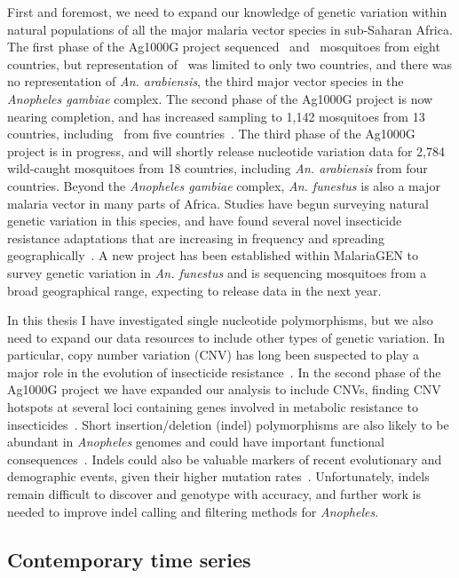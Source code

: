 \documentclass[a4paper,11pt,abstracton,hidelinks]{scrartcl}
\begin{document}
First and foremost, we need to expand our knowledge of genetic variation within natural populations of all the major malaria vector species in sub-Saharan Africa.
%
The first phase of the Ag1000G project sequenced \agam\ and \acol\ mosquitoes from eight countries, but representation of \acol\ was limited to only two countries, and there was no representation of \textit{An. arabiensis}, the third major vector species in the \textit{Anopheles gambiae} complex.
%
The second phase of the Ag1000G project is now nearing completion, and has increased sampling to 1,142 mosquitoes from 13 countries, including \acol\ from five countries~\parencite{Ag1000G2020}.
%
The third phase of the Ag1000G project is in progress, and will shortly release nucleotide variation data for 2,784 wild-caught mosquitoes from 18 countries, including \textit{An. arabiensis} from four countries.
%
Beyond the \textit{Anopheles gambiae} complex, \textit{An. funestus} is also a major malaria vector in many parts of Africa.
%
Studies have begun surveying natural genetic variation in this species, and have found several novel insecticide resistance adaptations that are increasing in frequency and spreading geographically~\parencite{Weedall2020}.
%
A new project has been established within MalariaGEN to survey genetic variation in \textit{An. funestus} and is sequencing mosquitoes from a broad geographical range, expecting to release data in the next year.


In this thesis I have investigated single nucleotide polymorphisms, but we also need to expand our data resources to include other types of genetic variation.
%
In particular, copy number variation (CNV) has long been suspected to play a major role in the evolution of insecticide resistance~\parencite{Devonshire1991,Hemingway1998,Bass2011}.
%
In the second phase of the Ag1000G project we have expanded our analysis to include CNVs, finding CNV hotspots at several loci containing genes involved in metabolic resistance to insecticides~\parencite{Lucas2019}.
%
Short insertion/deletion (indel) polymorphisms are also likely to be abundant in \textit{Anopheles} genomes and could have important functional consequences~\parencite{Montgomery2013}.
%
Indels could also be valuable markers of recent evolutionary and demographic events, given their higher mutation rates~\parencite{Redmond2018}.
%
Unfortunately, indels remain difficult to discover and genotype with accuracy, and further work is needed to improve indel calling and filtering methods for \textit{Anopheles}.


\subsection{Contemporary time series}
\end{document}
